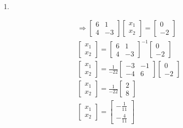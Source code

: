 \documentclass[
  letterpaper,
  DIV=11,
  numbers=noendperiod]{scrartcl}
\begin{document}
\begin{enumerate}
\def\labelenumi{\arabic{enumi})}
\setcounter{enumi}{1}
\item
\end{enumerate}

\begin{align*}
&\Rightarrow \begin{bmatrix}6 & 1 \\ 4 & -3\end{bmatrix}\begin{bmatrix}x_1 \\ x_2\end{bmatrix}=\begin{bmatrix}0 \\ -2\end{bmatrix} \\
&\begin{bmatrix}x_1 \\ x_2\end{bmatrix}=\begin{bmatrix}6 & 1 \\ 4 & -3\end{bmatrix}^{-1}\begin{bmatrix}0 \\ -2\end{bmatrix} \\
&\begin{bmatrix}x_1 \\ x_2\end{bmatrix}=\frac{1}{-22}\begin{bmatrix}-3 & -1 \\ -4 & 6\end{bmatrix}\begin{bmatrix}0 \\ -2\end{bmatrix} \\
&\begin{bmatrix}x_1 \\ x_2\end{bmatrix}=\frac{1}{-22}\begin{bmatrix}2 \\ 8\end{bmatrix} \\
&\begin{bmatrix}x_1 \\ x_2\end{bmatrix}=\begin{bmatrix}-\frac{1}{11} \\ -\frac{4}{11}\end{bmatrix}
\end{align*}
\end{document}
